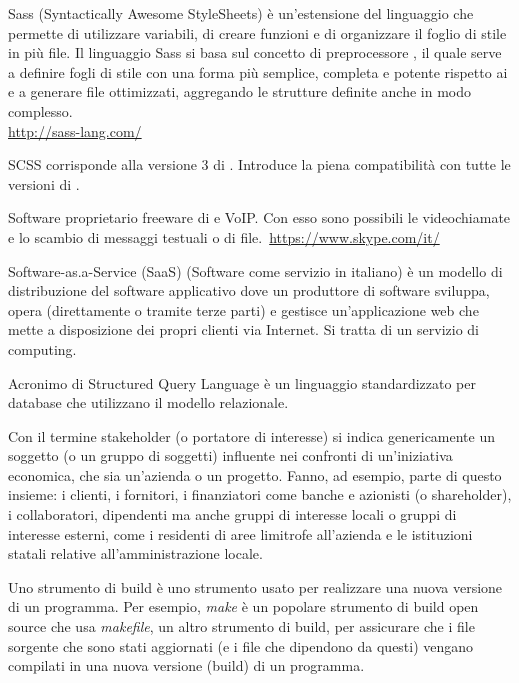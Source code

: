 Sass (Syntactically Awesome StyleSheets) è un'estensione del linguaggio  che permette di utilizzare variabili, di creare funzioni e di organizzare il foglio di stile in più file. Il linguaggio Sass si basa sul concetto di preprocessore , il quale serve a definire fogli di stile con una forma più semplice, completa e potente rispetto ai  e a generare file  ottimizzati, aggregando le strutture definite anche in modo complesso.\\
\url{http://sass-lang.com/}

SCSS corrisponde alla versione 3 di . Introduce la piena compatibilità con tutte le versioni di .

Software proprietario freeware di  e VoIP. Con esso sono possibili le videochiamate e lo scambio di messaggi testuali o di file.\
\url{https://www.skype.com/it/}

Software-as.a-Service (SaaS) (Software come servizio in italiano) è un modello di distribuzione del software applicativo dove un produttore di software sviluppa, opera (direttamente o tramite terze parti) e gestisce un'applicazione web che mette a disposizione dei propri clienti via Internet. Si tratta di un servizio di  computing.

Acronimo di Structured Query Language \`e un linguaggio standardizzato per database che utilizzano il modello relazionale.

Con il termine stakeholder (o portatore di interesse) si indica genericamente un soggetto (o un gruppo di soggetti) influente nei confronti di un'iniziativa economica, che sia un'azienda o un progetto.
Fanno, ad esempio, parte di questo insieme: i clienti, i fornitori, i finanziatori come banche e azionisti (o shareholder), i collaboratori, dipendenti ma anche gruppi di interesse locali o gruppi di interesse esterni, come i residenti di aree limitrofe all'azienda e le istituzioni statali relative all'amministrazione locale.

Uno strumento di build è uno strumento usato per realizzare una nuova versione di un programma. Per esempio, \textit{make} è un popolare strumento di build open source che usa \textit{makefile}, un altro strumento di build, per assicurare che i file sorgente che sono stati aggiornati (e i file che dipendono da questi) vengano compilati in una nuova versione (build) di un programma.

